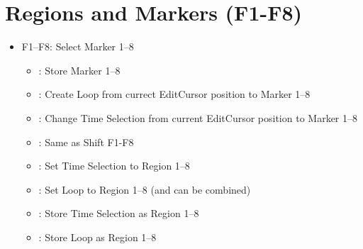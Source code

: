 \section{Regions and Markers (F1-F8)}\label{regions}
\begin{itemize}
\item F1--F8: Select Marker 1--8
\bemod
\begin{itemize}
	\item \control: Store Marker 1--8
	\item \shift: Create Loop from currect EditCursor position to Marker 1--8
	\item \shift \option: Change Time Selection from current EditCursor position to Marker 1--8
	\item \shift \alt: Same as Shift F1-F8
	\item \option: Set Time Selection to Region 1--8
	\item \alt: Set Loop to Region 1--8 (\alt and \option can be combined)
	\item \control \option: Store Time Selection as Region 1--8
	\item \control \alt: Store Loop as Region 1--8
\end{itemize}
\end{itemize}
